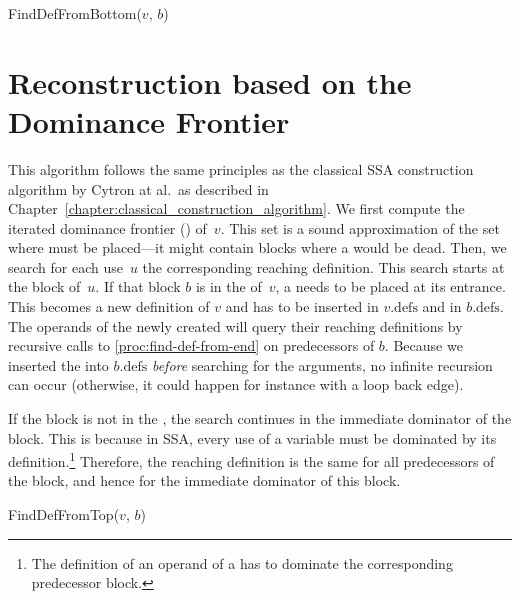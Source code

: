 {\begin{procedure}
  \caption{FindDefFromBottom($v$, $b$)}
  \label{proc:find-def-from-end}
\end{procedure}

\section{Reconstruction based on the Dominance Frontier}
This algorithm follows the same principles as the classical SSA construction algorithm by Cytron at al.~as described in Chapter~\ref{chapter:classical_construction_algorithm}.
We first compute the iterated dominance frontier (\iDF) of~$v$.
This set is a sound approximation of the set where \phifuns must be placed---it might contain blocks where a \phifun would be dead.
Then, we search for each use~$u$ the corresponding reaching definition.
This search starts at the block of~$u$.
If that block $b$ is in the \iDF of~$v$, a \phifun needs to be placed at its entrance.
This \phifun becomes a new definition of $v$ and has to be inserted in $v.\textrm{defs}$ and in $b.\textrm{defs}$.
The operands of the newly created \phifun will query their reaching definitions by recursive calls to \ref{proc:find-def-from-end} on predecessors of $b$.
Because we inserted the \phifun into $b.\textrm{defs}$ \emph{before} searching for the arguments, no infinite recursion can occur (otherwise, it could happen for instance with a loop back edge).

If the block is not in the \iDF, the search continues in the immediate dominator of the block.
This is because in SSA, every use of a variable must be dominated by its definition.\footnote{The definition of an operand of a \phifun has to dominate the corresponding predecessor block.}
Therefore, the reaching definition is the same for all predecessors of the block, and hence for the immediate dominator of this block.

\begin{procedure}
  \caption{FindDefFromTop($v$, $b$)}
  \label{proc:def-from-end-ssaconstr}
\end{procedure}

}
